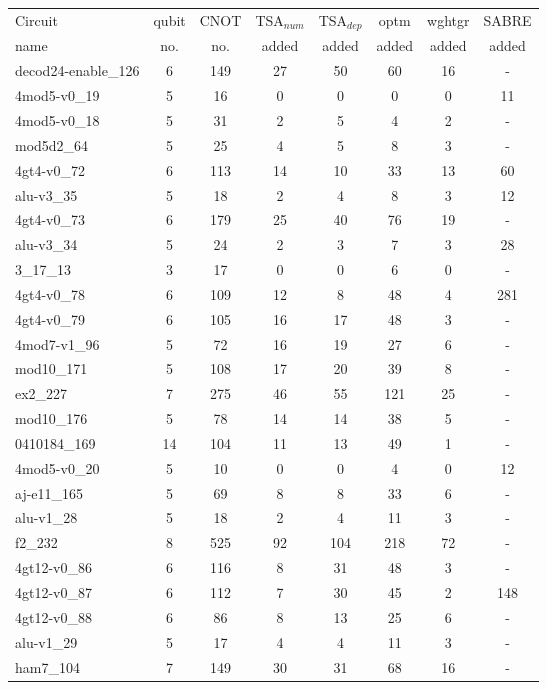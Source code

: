 \documentclass[journal]{IEEEtran}
\begin{document}
\begin{table*}[htbp]
    \begin{center}  
    \begin{tabular}{|p{4.3cm}<{\centering}|c|c|c|c|c|c|c|}
    \hline
    Circuit &  qubit  & CNOT &TSA$_{num}$& TSA$_{dep}$  & optm 	 & wghtgr  &SABRE 	\\
     name	&   no. 	&	no. & added&  added &  added 	&  added&  added\\
    \hline
    decod24-enable\_126 & 6 & 149 & 27 & 50 & 60 & 16 & - \\ 
4mod5-v0\_19 & 5 & 16 & 0 & 0 & 0 & 0 & 11 \\ 
4mod5-v0\_18 & 5 & 31 & 2 & 5 & 4 & 2 & - \\ 
mod5d2\_64 & 5 & 25 & 4 & 5 & 8 & 3 & - \\ 
4gt4-v0\_72 & 6 & 113 & 14 & 10 & 33 & 13 & 60 \\ 
alu-v3\_35 & 5 & 18 & 2 & 4 & 8 & 3 & 12 \\ 
4gt4-v0\_73 & 6 & 179 & 25 & 40 & 76 & 19 & - \\ 
alu-v3\_34 & 5 & 24 & 2 & 3 & 7 & 3 & 28 \\ 
3\_17\_13 & 3 & 17 & 0 & 0 & 6 & 0 & - \\ 
4gt4-v0\_78 & 6 & 109 & 12 & 8 & 48 & 4 & 281 \\ 
4gt4-v0\_79 & 6 & 105 & 16 & 17 & 48 & 3 & - \\ 
4mod7-v1\_96 & 5 & 72 & 16 & 19 & 27 & 6 & - \\ 
mod10\_171 & 5 & 108 & 17 & 20 & 39 & 8 & - \\ 
ex2\_227 & 7 & 275 & 46 & 55 & 121 & 25 & - \\ 
mod10\_176 & 5 & 78 & 14 & 14 & 38 & 5 & - \\ 
0410184\_169 & 14 & 104 & 11 & 13 & 49 & 1 & - \\ 
4mod5-v0\_20 & 5 & 10 & 0 & 0 & 4 & 0 & 12 \\ 
aj-e11\_165 & 5 & 69 & 8 & 8 & 33 & 6 & - \\ 
alu-v1\_28 & 5 & 18 & 2 & 4 & 11 & 3 & - \\ 
f2\_232 & 8 & 525 & 92 & 104 & 218 & 72 & - \\ 
4gt12-v0\_86 & 6 & 116 & 8 & 31 & 48 & 3 & - \\ 
4gt12-v0\_87 & 6 & 112 & 7 & 30 & 45 & 2 & 148 \\ 
4gt12-v0\_88 & 6 & 86 & 8 & 13 & 25 & 6 & - \\ 
alu-v1\_29 & 5 & 17 & 4 & 4 & 11 & 3 & - \\ 
ham7\_104 & 7 & 149 & 30 & 31 & 68 & 16 & - \\ 

\end{tabular}
\end{center}
\end{table*}
\end{document}
